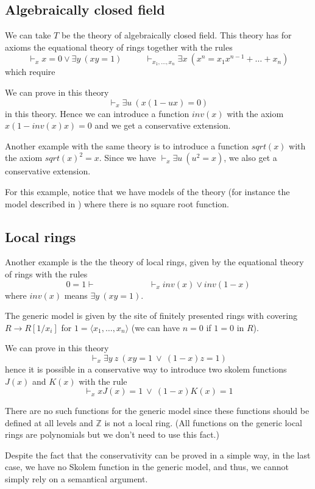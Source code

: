 \documentclass[10pt,a4paper]{article}
\newcommand{\ideal}[1]{\langle #1\rangle}
\newcommand{\ints}{\mathbb{Z}}
\begin{document}
\subsection{Algebraically closed field}

 We can take $T$ be the theory of algebraically closed field. This theory
has for axioms the equational theory of rings together with the rules
$$
\vdash_x x = 0 \vee \exists y~(xy = 1)~~~~~~~~~~~~
\vdash_{x_1,\dots,x_n} \exists x~(x^n = x_1 x^{n-1} + \dots + x_n)
$$which require

 We can prove in this theory
$$
\vdash_{x} \exists u~ (x(1-ux) = 0)
$$
in this theory. Hence we can introduce a function $inv(x)$ with the axiom
$x(1 -inv(x) x) = 0$ and we get a conservative extension. 

 Another example with the same theory is to introduce a function $sqrt(x)$ with the axiom
$sqrt(x)^2 = x$. Since we have $\vdash_{x} \exists u~(u^2 = x)$, we also get a conservative
extension.

 For this example, notice that we have models of the theory (for instance the model described
in \cite{Mannaa}) where there is no square root function.

\subsection{Local rings}

 Another example is the the theory of local rings, given by the equational theory of rings
with the rules
$$
0=1\vdash~~~~~~~~~~~~~~~~~~~~~~~~~~~~\vdash_x inv(x)\vee inv(1-x)
$$
where $inv(x)$ means $\exists y~(xy = 1)$. 

 The generic model is given by the site of finitely presented rings with covering
$R\rightarrow R[1/x_i]$ for $1 = \ideal{x_1,\dots,x_n}$ (we can have $n = 0$ if $1=0$ in $R$).

 We can prove in this theory
$$
\vdash_x \exists y~z~(x y = 1~\vee ~(1-x) z = 1)
$$
hence it is possible in a conservative way
to introduce two skolem functions $J(x)$ and $K(x)$ with the rule
$$
\vdash_x xJ(x) = 1~\vee~(1-x)K(x) = 1
$$

 There are no such functions for the generic model since these functions should be defined
at all levels and $\ints$ is not a local ring.
(All functions on the generic local rings are polynomials but we don't need to use this fact.)

\medskip

 Despite the fact that the conservativity can be proved in a simple way, in the last case, we
have no Skolem function in the generic model, and thus, we cannot simply rely on a semantical
argument.
\end{document}
